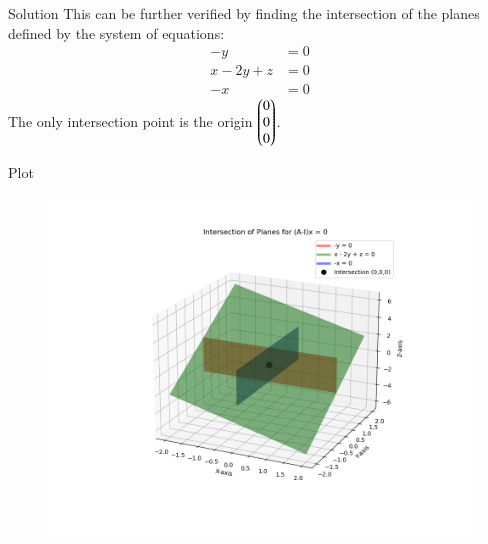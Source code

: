 \documentclass{beamer}
\begin{document}
\begin{frame}{Solution}
This can be further verified by finding the intersection of the planes defined by the system of equations:
\begin{align}
-y &= 0 \\
x-2y+z&=0 \\
-x &= 0
\end{align}
The only intersection point is the origin $\begin{pmatrix}0 \\ 0 \\ 0\end{pmatrix}$.
\end{frame}
\begin{frame}{Plot}
    \begin{figure}[H]
        \centering
        \includegraphics[height=0.5\textheight, keepaspectratio]{figs/Figure_1.png}
    \end{figure}
\end{frame}
\end{document}
